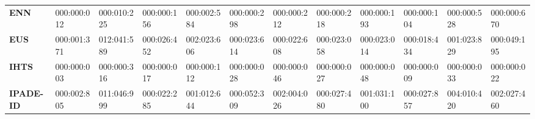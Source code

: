 {{\begin{tabular}{llllllllllll}
\textbf{ENN}                  & 000:000:012                                                                            & 000:010:225                                                                          & 000:000:156                         & 000:002:584                           & 000:000:298                                                                                      & 000:000:212                           & 000:000:218                           & 000:000:193                           & 000:000:104                            & 000:000:528                         & 000:000:670                                                                          \\
\textbf{EUS}                  & 000:001:371                                                                            & 012:041:589                                                                          & 000:026:452                         & 002:023:606                           & 000:023:614                                                                                      & 000:022:608                           & 000:023:058                           & 000:023:014                           & 000:018:434                            & 001:023:829                         & 000:049:195                                                                          \\
\textbf{IHTS}                 & 000:000:003                                                                            & 000:000:316                                                                          & 000:000:017                         & 000:000:112                           & 000:000:028                                                                                      & 000:000:046                           & 000:000:027                           & 000:000:048                           & 000:000:009                            & 000:000:033                         & 000:000:022                                                                          \\
\textbf{IPADE-ID}             & 000:002:805                                                                            & 011:046:999                                                                          & 000:022:285                         & 001:012:644                           & 000:052:309                                                                                      & 002:004:026                           & 000:027:480                           & 001:031:100                           & 000:027:857                            & 004:010:420                         & 002:027:460                                                                          \\

\end{tabular}}}
